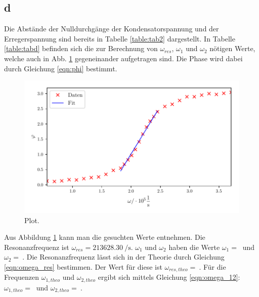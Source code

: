 \subsection{d}
Die Abstände der Nulldurchgänge der Kondensatorspannung und
der Erregerspannung sind bereits in Tabelle \ref{table:tab2}
dargestellt. In Tabelle \ref{table:tabd} befinden sich die
zur Berechnung von $\omega_{res}$, $\omega_{1}$ und $\omega_{2}$
nötigen Werte, welche auch in Abb. \ref{fig:plotd} gegeneinander
aufgetragen sind. Die Phase wird dabei durch Gleichung \eqref{eqn:phi}
bestimmt.

\begin{figure}
  \centering
  \includegraphics{build/plotd.pdf}
  \caption{Plot.}
  \label{fig:plotd}
\end{figure}
\noindent Aus Abbildung \ref{fig:plotd} kann man die gesuchten Werte entnehmen. %
Die Resonanzfrequenz ist $\omega_{res} = \SI[per-mode=fraction]{213628.30}{\per\second}$.
$\omega_{1}$ und $\omega_{2}$ haben die Werte
$\omega_{1} = \SI{}{}$ und
$\omega_{2} = \SI{}{}$.
\newline
Die Resonanzfrequenz lässt sich in der Theorie durch 
Gleichung \eqref{eqn:omega_res} bestimmen.
Der Wert für diese ist $\omega_{res,theo} = \SI{}{}$.
Für die Frequenzen $\omega_{1,theo}$ und $\omega_{2,theo}$ ergibt sich
mittels Gleichung \eqref{eqn:omega_12}:
$\omega_{1,theo} = \SI{}{}$ und $\omega_{2,theo} = \SI{}{}$.
